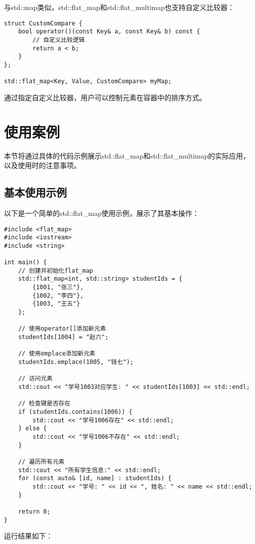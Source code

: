 \documentclass[a4paper, 12pt]{article}
\begin{document}
与std::map类似，std::flat\_map和std::flat\_multimap也支持自定义比较器：

\begin{lstlisting}[style=cpp]
struct CustomCompare {
    bool operator()(const Key& a, const Key& b) const {
        // 自定义比较逻辑
        return a < b;
    }
};

std::flat_map<Key, Value, CustomCompare> myMap;
\end{lstlisting}

通过指定自定义比较器，用户可以控制元素在容器中的排序方式。

\section{使用案例}

本节将通过具体的代码示例展示std::flat\_map和std::flat\_multimap的实际应用，以及使用时的注意事项。

\subsection{基本使用示例}

以下是一个简单的std::flat\_map使用示例，展示了其基本操作：

\begin{lstlisting}[style=cpp]
#include <flat_map>
#include <iostream>
#include <string>

int main() {
    // 创建并初始化flat_map
    std::flat_map<int, std::string> studentIds = {
        {1001, "张三"},
        {1002, "李四"},
        {1003, "王五"}
    };

    // 使用operator[]添加新元素
    studentIds[1004] = "赵六";

    // 使用emplace添加新元素
    studentIds.emplace(1005, "钱七");

    // 访问元素
    std::cout << "学号1003对应学生: " << studentIds[1003] << std::endl;

    // 检查键是否存在
    if (studentIds.contains(1006)) {
        std::cout << "学号1006存在" << std::endl;
    } else {
        std::cout << "学号1006不存在" << std::endl;
    }

    // 遍历所有元素
    std::cout << "所有学生信息:" << std::endl;
    for (const auto& [id, name] : studentIds) {
        std::cout << "学号: " << id << ", 姓名: " << name << std::endl;
    }

    return 0;
}
\end{lstlisting}

运行结果如下：
\end{document}
